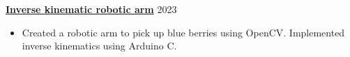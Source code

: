 \textbf{\href{https://github.com/lucamanolache/inverse-kinematics}{Inverse kinematic robotic arm}} \hfill 2023 \par
\begin{itemize}
	\item Created a robotic arm to pick up blue berries using OpenCV. Implemented inverse kinematics using Arduino C.
\end{itemize} \par
